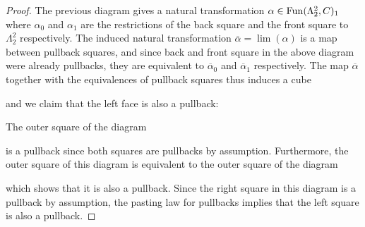 \begin{lemma}
\begin{proof}
        The previous diagram gives a natural transformation $\alpha\in\operatorname{Fun}(\Lambda_2^2,C)_1$ where $\alpha_0$ and $\alpha_1 $ are the restrictions of the back square and the front square to $\Lambda_2^2$ respectively.
        The induced natural transformation $\overline{\alpha}=\lim(\alpha)$ is a map between pullback squares, and since back and front square in the above diagram were already pullbacks, they are equivalent to $\overline{\alpha}_0$ and $\overline{\alpha}_1$ respectively.
        The map $\overline{\alpha}$ together with the equivalences of pullback squares thus induces a cube
        \begin{center}
        \end{center}
        and we claim that the left face is also a pullback:

        The outer square of the diagram
        \begin{center}
        \end{center}
        is a pullback since both squares are pullbacks by assumption.
        Furthermore, the outer square of this diagram is equivalent to the outer square of the diagram
        \begin{center}
        \end{center}
        which shows that it is also a pullback.
        Since the right square in this diagram is a pullback by assumption, the pasting law for pullbacks implies that the left square is also a pullback.


\end{proof}
\end{lemma}

